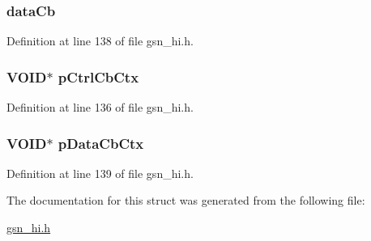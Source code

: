 \hypertarget{a00086_ab5e0c9ef2bdc4d0e354528b1080f21bc}{
\subsubsection[{dataCb}]{ {\bf dataCb}}}
\label{a00086_ab5e0c9ef2bdc4d0e354528b1080f21bc}


Definition at line 138 of file gsn\_\-hi.h.

\hypertarget{a00086_ad5ece2cca5793c5c804c56153c57be66}{
\subsubsection[{pCtrlCbCtx}]{\setlength{\rightskip}{0pt plus 5cm}VOID$\ast$ {\bf pCtrlCbCtx}}}
\label{a00086_ad5ece2cca5793c5c804c56153c57be66}


Definition at line 136 of file gsn\_\-hi.h.

\hypertarget{a00086_aaac1b748e9426eb856106f9227f7634d}{
\subsubsection[{pDataCbCtx}]{\setlength{\rightskip}{0pt plus 5cm}VOID$\ast$ {\bf pDataCbCtx}}}
\label{a00086_aaac1b748e9426eb856106f9227f7634d}


Definition at line 139 of file gsn\_\-hi.h.



The documentation for this struct was generated from the following file:\begin{DoxyCompactItemize}
\item 
\hyperlink{a00504}{gsn\_\-hi.h}\end{DoxyCompactItemize}
